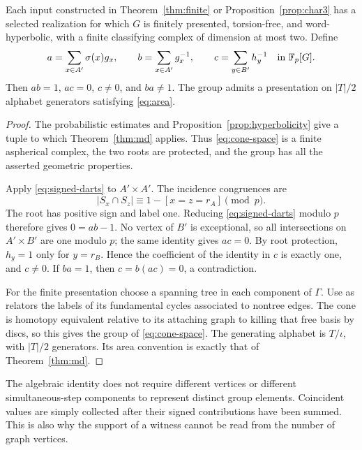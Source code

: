 \begin{theorem}\label{thm:realization}
Each input constructed in Theorem~\ref{thm:finite} or Proposition~\ref{prop:char3} has a selected realization for which $G$ is finitely presented, torsion-free, and word-hyperbolic, with a finite classifying complex of dimension at most two. Define
\begin{equation}\label{eq:witnesses}
 a=\sum_{x\in A'}\sigma(x)g_x,
 \qquad b=\sum_{x\in A'}g_x^{-1},
 \qquad c=\sum_{y\in B'}h_y^{-1}
 \quad\text{in }\mathbb F_p[G].
\end{equation}
Then $ab=1$, $ac=0$, $c\ne0$, and $ba\ne1$. The group admits a presentation on $|T|/2$ alphabet generators satisfying \eqref{eq:area}.
\end{theorem}
\begin{proof}
The probabilistic estimates and Proposition~\ref{prop:hyperbolicity} give a tuple to which Theorem~\ref{thm:md} applies. Thus \eqref{eq:cone-space} is a finite aspherical complex, the two roots are protected, and the group has all the asserted geometric properties.

Apply \eqref{eq:signed-darts} to $A'\times A'$. The incidence congruences are
\[
 |S_x\cap S_z|\equiv1-[x=z=r_A]\pmod p.
\]
The root has positive sign and label one. Reducing \eqref{eq:signed-darts} modulo $p$ therefore gives $0=ab-1$. No vertex of $B'$ is exceptional, so all intersections on $A'\times B'$ are one modulo $p$; the same identity gives $ac=0$. By root protection, $h_y=1$ only for $y=r_B$. Hence the coefficient of the identity in $c$ is exactly one, and $c\ne0$. If $ba=1$, then $c=b(ac)=0$, a contradiction.

For the finite presentation choose a spanning tree in each component of $\Gamma$. Use as relators the labels of its fundamental cycles associated to nontree edges. The cone is homotopy equivalent relative to its attaching graph to killing that free basis by discs, so this gives the group of \eqref{eq:cone-space}. The generating alphabet is $T/\iota$, with $|T|/2$ generators. Its area convention is exactly that of Theorem~\ref{thm:md}.
\end{proof}

The algebraic identity does not require different vertices or different simultaneous-step components to represent distinct group elements. Coincident values are simply collected after their signed contributions have been summed. This is also why the support of a witness cannot be read from the number of graph vertices.

